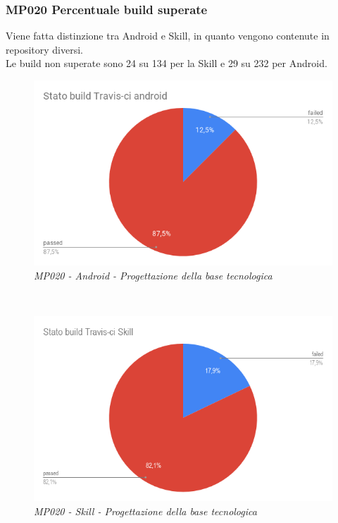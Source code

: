 \subsubsection{MP020 Percentuale build superate}
Viene fatta distinzione tra Android e Skill, in quanto vengono contenute in repository diversi.\\
Le build non superate sono 24 su 134 per la Skill e 29 su 232 per Android.
\begin{figure} [h]
    \centering
	\includegraphics[scale=0.5]{./images/StatobuildTravis-ciandroid.png}
    \caption{\textit{MP020 - Android - Progettazione della base tecnologica}}\label{}
\end{figure}\\
\begin{figure} [h]
    \centering
	\includegraphics[scale=0.5]{./images/StatobuildTravis-ciSkill.png}
    \caption{\textit{MP020 - Skill - Progettazione della base tecnologica}}\label{}
\end{figure}
\clearpage
